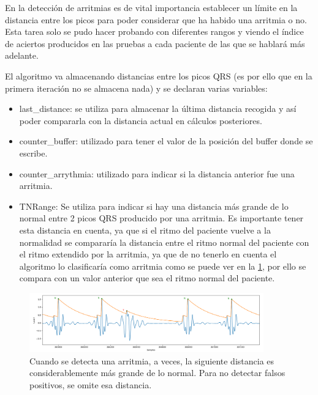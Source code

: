 En la detección de arritmias es de vital importancia establecer un límite en la distancia entre los picos
para poder considerar que ha habido una arritmia o no. Esta tarea solo se pudo hacer probando con diferentes
rangos y viendo el índice de aciertos producidos en las pruebas a cada paciente de las que se hablará más adelante. 

El algoritmo va almacenando distancias entre los picos QRS (es por ello que en la primera iteración no se almacena nada)
y se declaran varias variables:

\begin{itemize}
    \item last\_distance: se utiliza para almacenar la última distancia recogida y así poder compararla con la distancia 
    actual en cálculos posteriores.
    \item counter\_buffer: utilizado para tener el valor de la posición del buffer donde se escribe.
    \item counter\_arrythmia: utilizado para indicar si la distancia anterior fue una arritmia.
    \item TNRange: Se utiliza para indicar si hay una distancia más grande de lo normal entre 2 picos QRS producido
    por una arritmia. Es importante tener esta distancia en cuenta, ya que si el ritmo del paciente vuelve a la
    normalidad se compararía la distancia entre el ritmo normal del paciente con el ritmo extendido por la arritmia,
    ya que de no tenerlo en cuenta el algoritmo lo clasificaría como arritmia como se puede ver en la \cref{fig:senial_explicacion_TNRANGE}, por ello se compara con un valor anterior
    que sea el ritmo normal del paciente.
\end{itemize}

\begin{figure}[h!]
    \centering
    \includegraphics[width=0.9\textwidth]{./Images/img_algoritmo/senial_explicacion_TNRANGE.png}
    \caption{Cuando se detecta una arritmia, a veces, la siguiente distancia es considerablemente más grande de lo normal. Para no detectar falsos positivos, se omite esa distancia.}
    \label{fig:senial_explicacion_TNRANGE}
\end{figure}


